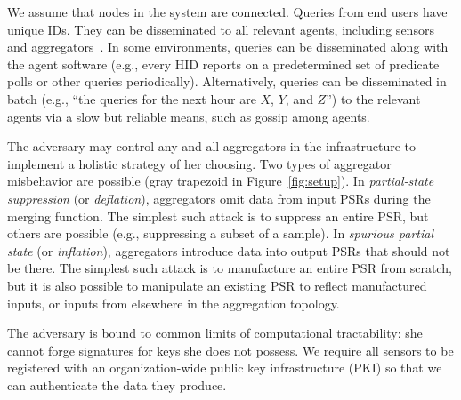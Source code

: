 \documentclass[10pt,twocolumn]{article}
\newcommand{\sstitle}[1]{\noindent{\bf #1\/}}
\begin{document}
We assume that  nodes
in the system are connected.  Queries from end users have unique IDs. They can be
disseminated to all relevant agents, including
sensors and aggregators~\cite{Madden2002,Huebsch2004}.
In some environments, queries can be disseminated along with the agent
software (e.g., every HID reports on a predetermined set of predicate
polls or other queries periodically).  Alternatively, queries can be
disseminated in batch (e.g., ``the queries for the next hour are $X$, $Y$,
and $Z$'') to the relevant agents via a slow but reliable means, such as
gossip among agents.


\sstitle{Threat Model.}
The adversary may control any and all
aggregators in the infrastructure to implement a holistic
strategy of her choosing. 
Two types of aggregator misbehavior are possible
(gray trapezoid in Figure~\ref{fig:setup}).
In \emph{partial-state suppression} (or \emph{deflation}), 
aggregators
omit data from input PSRs during the merging function.  The
simplest such attack is to suppress an entire PSR, but others are
possible (e.g., suppressing a subset of a sample).  In \emph{spurious partial state}
(or \emph{inflation}), aggregators introduce data into output PSRs that
should not be there.  The simplest such attack is to manufacture an
entire PSR from scratch, but it is also possible to manipulate an existing PSR to
reflect manufactured inputs, or inputs from elsewhere in the aggregation
topology.

The adversary is bound to common limits of computational tractability:
she cannot forge signatures for keys she does not possess.
We require all sensors
to be registered with an organization-wide public key
infrastructure (PKI) so that we can authenticate the 
data they produce.
\end{document}
